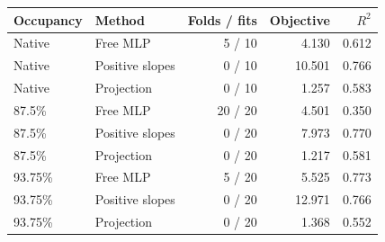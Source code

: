 \begin{tabular}{llrrr}
\toprule
Occupancy & Method & Folds / fits & Objective & $R^2$ \\
\midrule
Native & Free MLP & 5 / 10 & 4.130 & 0.612 \\
Native & Positive slopes & 0 / 10 & 10.501 & 0.766 \\
Native & Projection & 0 / 10 & 1.257 & 0.583 \\
87.5\% & Free MLP & 20 / 20 & 4.501 & 0.350 \\
87.5\% & Positive slopes & 0 / 20 & 7.973 & 0.770 \\
87.5\% & Projection & 0 / 20 & 1.217 & 0.581 \\
93.75\% & Free MLP & 5 / 20 & 5.525 & 0.773 \\
93.75\% & Positive slopes & 0 / 20 & 12.971 & 0.766 \\
93.75\% & Projection & 0 / 20 & 1.368 & 0.552 \\
\bottomrule
\end{tabular}

